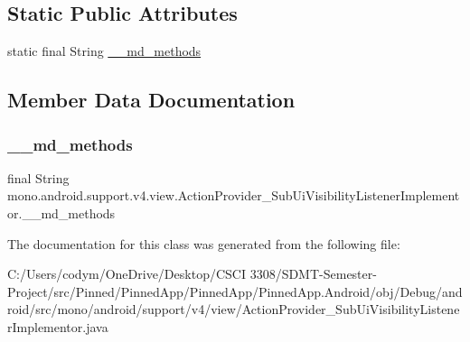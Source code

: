\subsection*{Static Public Attributes}
\begin{DoxyCompactItemize}
\item 
static final String \hyperlink{classmono_1_1android_1_1support_1_1v4_1_1view_1_1_action_provider___sub_ui_visibility_listener_implementor_a80f46f5139a7d5baf9a0c701c053b68d}{\+\_\+\+\_\+md\+\_\+methods}
\end{DoxyCompactItemize}


\subsection{Member Data Documentation}
\mbox{\label{classmono_1_1android_1_1support_1_1v4_1_1view_1_1_action_provider___sub_ui_visibility_listener_implementor_a80f46f5139a7d5baf9a0c701c053b68d}} 
\subsubsection{\texorpdfstring{\+\_\+\+\_\+md\+\_\+methods}{\_\_md\_methods}}
{\footnotesize\ttfamily final String mono.\+android.\+support.\+v4.\+view.\+Action\+Provider\+\_\+\+Sub\+Ui\+Visibility\+Listener\+Implementor.\+\_\+\+\_\+md\+\_\+methods\hspace{0.3cm}{\ttfamily [static]}}



The documentation for this class was generated from the following file\+:\begin{DoxyCompactItemize}
\item 
C\+:/\+Users/codym/\+One\+Drive/\+Desktop/\+C\+S\+C\+I 3308/\+S\+D\+M\+T-\/\+Semester-\/\+Project/src/\+Pinned/\+Pinned\+App/\+Pinned\+App/\+Pinned\+App.\+Android/obj/\+Debug/android/src/mono/android/support/v4/view/Action\+Provider\+\_\+\+Sub\+Ui\+Visibility\+Listener\+Implementor.\+java\end{DoxyCompactItemize}
